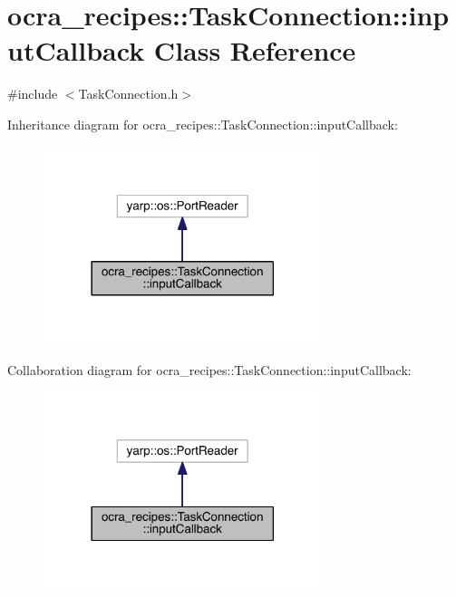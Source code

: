 \hypertarget{classocra__recipes_1_1TaskConnection_1_1inputCallback}{}\section{ocra\+\_\+recipes\+:\+:Task\+Connection\+:\+:input\+Callback Class Reference}
\label{classocra__recipes_1_1TaskConnection_1_1inputCallback}


{\ttfamily \#include $<$Task\+Connection.\+h$>$}



Inheritance diagram for ocra\+\_\+recipes\+:\+:Task\+Connection\+:\+:input\+Callback\+:\nopagebreak
\begin{figure}[H]
\begin{center}
\leavevmode
\includegraphics[width=230pt]{d1/dd9/classocra__recipes_1_1TaskConnection_1_1inputCallback__inherit__graph}
\end{center}
\end{figure}


Collaboration diagram for ocra\+\_\+recipes\+:\+:Task\+Connection\+:\+:input\+Callback\+:\nopagebreak
\begin{figure}[H]
\begin{center}
\leavevmode
\includegraphics[width=230pt]{d1/dd4/classocra__recipes_1_1TaskConnection_1_1inputCallback__coll__graph}
\end{center}
\end{figure}
